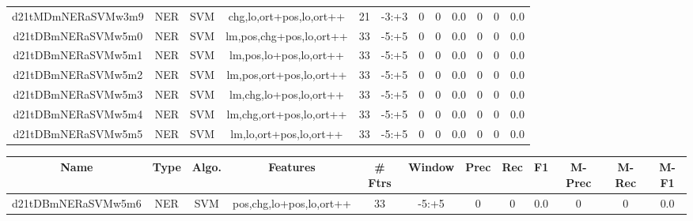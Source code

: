 \documentclass[a4paper]{article}
\begin{document}
\begin{landscape}
\begin{center}
\begin{tabular}{ |c|c|c|c|c|c|c|c|c|c|c|c|}
 
 	
 	\small{ d21tMDmNERaSVMw3m9 } & \small{ NER} & \small{  SVM }  & chg,lo,ort+pos,lo,ort++  &  21 &  \small{  -3:+3 }  &  0 & 0 & 0.0  &  0 & 0 & 0.0 \\
 	

 
 	
 	\small{ d21tDBmNERaSVMw5m0 } & \small{ NER} & \small{  SVM }  & lm,pos,chg+pos,lo,ort++  &  33 &  \small{  -5:+5 }  &  0 & 0 & 0.0  &  0 & 0 & 0.0 \\
 	

 
 	
 	\small{ d21tDBmNERaSVMw5m1 } & \small{ NER} & \small{  SVM }  & lm,pos,lo+pos,lo,ort++  &  33 &  \small{  -5:+5 }  &  0 & 0 & 0.0  &  0 & 0 & 0.0 \\
 	

 
 	
 	\small{ d21tDBmNERaSVMw5m2 } & \small{ NER} & \small{  SVM }  & lm,pos,ort+pos,lo,ort++  &  33 &  \small{  -5:+5 }  &  0 & 0 & 0.0  &  0 & 0 & 0.0 \\
 	

 
 	
 	\small{ d21tDBmNERaSVMw5m3 } & \small{ NER} & \small{  SVM }  & lm,chg,lo+pos,lo,ort++  &  33 &  \small{  -5:+5 }  &  0 & 0 & 0.0  &  0 & 0 & 0.0 \\
 	

 
 	
 	\small{ d21tDBmNERaSVMw5m4 } & \small{ NER} & \small{  SVM }  & lm,chg,ort+pos,lo,ort++  &  33 &  \small{  -5:+5 }  &  0 & 0 & 0.0  &  0 & 0 & 0.0 \\
 	

 
 	
 	\small{ d21tDBmNERaSVMw5m5 } & \small{ NER} & \small{  SVM }  & lm,lo,ort+pos,lo,ort++  &  33 &  \small{  -5:+5 }  &  0 & 0 & 0.0  &  0 & 0 & 0.0 \\
 	
 \hline
\end{tabular}
\end{center}




\begin{center}
\begin{tabular}{ |c|c|c|c|c|c|c|c|c|c|c|c|} 
 \hline
 	Name & Type & Algo. & Features & \# Ftrs & Window & Prec & Rec & F1 & M-Prec & M-Rec & M-F1\\
 \hline

 	

 
 	
 	\small{ d21tDBmNERaSVMw5m6 } & \small{ NER} & \small{  SVM }  & pos,chg,lo+pos,lo,ort++  &  33 &  \small{  -5:+5 }  &  0 & 0 & 0.0  &  0 & 0 & 0.0 \\
 	


\end{tabular}
\end{center}
\end{landscape}
\end{document}

